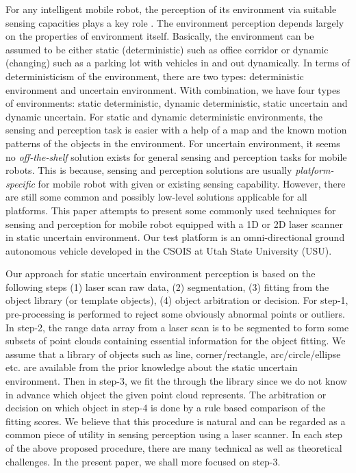 \documentclass{cdcarta4}
\begin{document}
For any intelligent mobile robot, the perception of its environment via suitable sensing capacities plays a key role \cite{Adams99,Nourbakhsh97}. The  environment perception depends largely on the properties of environment itself. Basically, the environment can be assumed to be either static (deterministic) such as office corridor  or dynamic (changing) such as a   parking lot with vehicles in and out dynamically. In terms of 
deterministicism of the environment, there are two types: deterministic environment and uncertain environment.
With combination, we have four types of environments: static deterministic, dynamic deterministic, static uncertain and dynamic uncertain. For static and dynamic deterministic environments, the sensing and perception task is easier with a help of a map and the known motion patterns of the objects in the environment. For uncertain environment, it seems no {\em off-the-shelf} solution exists for general sensing and perception tasks for mobile robots. This is because,  sensing and perception  solutions  are usually {\em platform-specific}  for mobile robot with given or existing sensing capability. However, there are still some common and possibly low-level solutions applicable for all platforms. This paper attempts to present some commonly used  techniques for sensing and perception for  mobile robot equipped with a 1D or 2D laser scanner in static uncertain environment.
%
Our test platform is an omni-directional ground autonomous vehicle developed in the CSOIS at Utah State University (USU).



Our approach for static uncertain environment perception is based on the following steps (1) laser scan raw data, (2) segmentation, (3) fitting from the object library (or template objects), (4) object arbitration or decision. 
For step-1, pre-processing is performed to reject some obviously abnormal points or outliers.
In step-2, the range data array from a laser scan is to be segmented to form some subsets of point clouds containing essential information for the object fitting. We assume that a library of objects such as line, corner/rectangle, arc/circle/ellipse etc. are available from the prior knowledge about the static uncertain environment.
Then in step-3, we fit the through the library since we do not know in advance which object the given point cloud represents. The arbitration or decision on which object in step-4 is done by a rule based comparison of the fitting scores. We believe that this procedure is natural and can be regarded as a common piece of utility in sensing perception using a laser scanner. In each step of the above proposed procedure, there are many technical as well as theoretical challenges. In the present paper, we shall more focused on step-3. 
\end{document}
